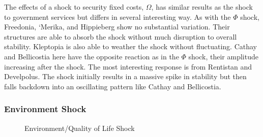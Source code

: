 \documentclass[12pt]{article}
\begin{document}
\begin{spacing}{1.5}
\begin{figure}
\end{figure}

The effects of a shock to security fixed costs, $\Omega$, has similar results as the shock to government services but differs in several interesting way. As with the $\Phi$ shock, Freedonia, `Merika, and Hippieberg show no substantial variation. Their structures are able to absorb the shock without much disruption to overall stability. Kleptopia is also able to weather the shock without fluctuating. Cathay and Bellicostia here have the opposite reaction as in the $\Phi$ shock, their amplitude increasing after the shock. The most interesting response is from Rentistan and Develpolus. The shock initially results in a massive spike in stability but then falls backdown into an oscillating pattern like Cathay and Bellicostia. 

\subsubsection{Environment Shock}

\begin{figure}
\centering
{} 
\caption{Environment/Quality of Life Shock}


\end{figure}
\end{spacing}
\end{document}
